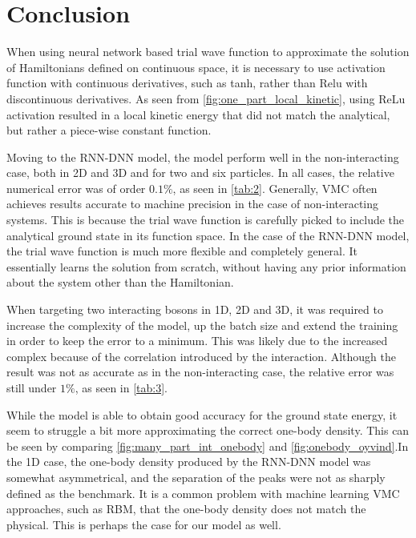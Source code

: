 \begin{minipage}{\columnwidth}
\section{Conclusion}\label{sec:Conclusion}
When using neural network based trial wave function to approximate the solution of Hamiltonians defined on continuous space, it is necessary to use activation function with continuous derivatives, such as tanh, rather than Relu with discontinuous derivatives. As seen from \autoref{fig:one_part_local_kinetic}, using ReLu activation resulted in a local kinetic energy that did not match the analytical, but rather a piece-wise constant function.

Moving to the RNN-DNN model, the model perform well in the non-interacting case, both in 2D and 3D and for two and six particles. In all cases, the relative numerical error was of order $0.1\%$, as seen in \autoref{tab:2}. Generally, VMC often achieves results accurate to machine precision in the case of non-interacting systems. This is because the trial wave function is carefully picked to include the analytical ground state in its function space. In the case of the RNN-DNN model, the trial wave function is much more flexible and completely general. It essentially learns the solution from scratch, without having any prior information about the system other than the Hamiltonian.

When targeting two interacting bosons in 1D, 2D and 3D, it was required to increase the complexity of the model, up the batch size and extend the training in order to keep the error to a minimum. This was likely due to the increased complex because of the correlation introduced by the interaction. Although the result was not as accurate as in the non-interacting case, the relative error was still under $1\%$, as seen in \autoref{tab:3}.

While the model is able to obtain good accuracy for the ground state energy, it seem to struggle a bit more approximating the correct one-body density. This can be seen by comparing \autoref{fig:many_part_int_onebody} and \autoref{fig:onebody_oyvind}.In the 1D case, the one-body density produced by the RNN-DNN model was somewhat asymmetrical, and the separation of the peaks were not as sharply defined as the benchmark. It is a common problem with machine learning VMC approaches, such as RBM, that the one-body density does not match the physical. This is perhaps the case for our model as well.

\end{minipage}

